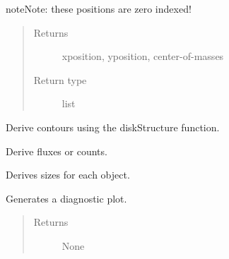 \documentclass[a4paper,11pt,english]{sphinxmanual}
\begin{document}
\begin{fulllineitems}
\begin{fulllineitems}
\begin{notice}{note}{Note:}
these positions are zero indexed!
\end{notice}
\begin{quote}\begin{description}
\item[{Returns}] \leavevmode
xposition, yposition, center-of-masses

\item[{Return type}] \leavevmode
list

\end{description}\end{quote}

\end{fulllineitems}


\begin{fulllineitems}
Derive contours using the diskStructure function.

\end{fulllineitems}


\begin{fulllineitems}
Derive fluxes or counts.

\end{fulllineitems}


\begin{fulllineitems}
Derives sizes for each object.

\end{fulllineitems}


\begin{fulllineitems}
Generates a diagnostic plot.
\begin{quote}\begin{description}
\item[{Returns}] \leavevmode
None

\end{description}\end{quote}

\end{fulllineitems}


\end{fulllineitems}
\end{document}
